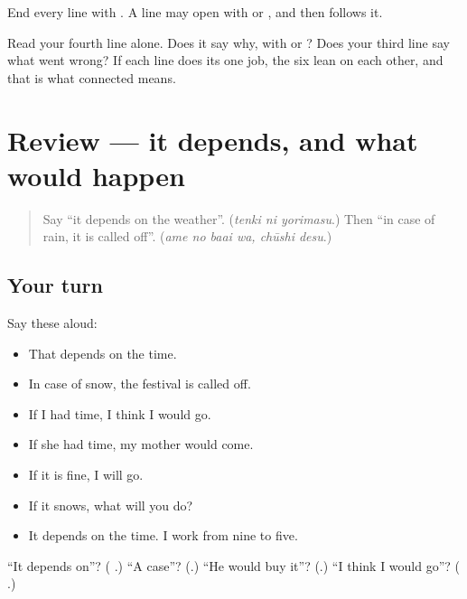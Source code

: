 End every line with \textbf{}. A line may open with \textbf{} or \textbf{}, and then \textbf{} follows it.

\begin{tcolorbox}[breakable,colback=teal!4,colframe=teal!35!black,title={Before you move on}]
Read your fourth line alone. Does it say why, with \textbf{} or \textbf{}? Does your third line say what went wrong? If each line does its one job, the six lean on each other, and that is what connected means.
\end{tcolorbox}
\section[(review)]{Review — it depends, and what would happen}

\label{lesson:JA-R261-it-depends}



\begin{quote}
Say \textquotedblleft{}it depends on the weather\textquotedblright{}. (\emph{tenki ni yorimasu}.) Then \textquotedblleft{}in case of rain, it is called off\textquotedblright{}. (\emph{ame no baai wa, chūshi desu}.)
\end{quote}

\subsection*{Your turn}
Say these aloud:

\begin{itemize}
\raggedright
  \item That depends on the time.
  \item In case of snow, the festival is called off.
  \item If I had time, I think I would go.
  \item If she had time, my mother would come.
  \item If it is fine, I will go.
  \item If it snows, what will you do?
  \item It depends on the time. I work from nine to five.
\end{itemize}

\begin{tcolorbox}[breakable,colback=teal!4,colframe=teal!35!black,title={Before you move on}]
\textquotedblleft{}It depends on\textquotedblright{}? (\textbf{ }.) \textquotedblleft{}A case\textquotedblright{}? (\textbf{}.) \textquotedblleft{}He would buy it\textquotedblright{}? (\textbf{}.) \textquotedblleft{}I think I would go\textquotedblright{}? (\textbf{ }.)
\end{tcolorbox}
